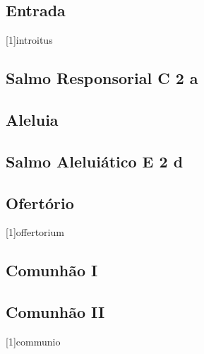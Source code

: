 
\subsection{Entrada}\label{subsection:tempus-nativitatis/sanctae-dei-genetricis-mariae/introitus}
[1]{introitus}

\AllowPageFlush

\subsection[Salmo Responsorial]{Salmo Responsorial \textmd{C 2 a}}\label{subsection:tempus-nativitatis/sanctae-dei-genetricis-mariae/psalmus-responsorius}

\AllowPageFlush

\subsection{Aleluia}\label{subsection:tempus-nativitatis/sanctae-dei-genetricis-mariae/alleluia}

\AllowPageFlush

\subsection[Salmo Aleluiático]{Salmo Aleluiático \textmd{E 2 d}}\label{subsection:tempus-nativitatis/sanctae-dei-genetricis-mariae/psalmus-alleluiaticus}

\AllowPageFlush

\subsection{Ofertório}\label{subsection:tempus-nativitatis/sanctae-dei-genetricis-mariae/offertorium}
[1]{offertorium}

\AllowPageFlush

\subsection{Comunhão I}\label{subsection:tempus-nativitatis/sanctae-dei-genetricis-mariae/communio-1}

\AllowPageFlush

\subsection{Comunhão II}\label{subsection:tempus-nativitatis/sanctae-dei-genetricis-mariae/communio-2}
[1]{communio}